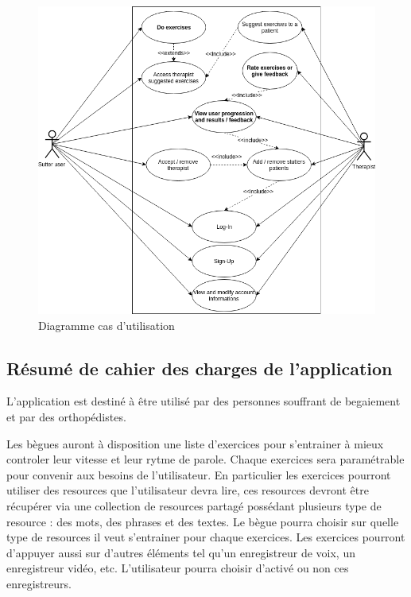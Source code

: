 \begin{figure}
  \includegraphics[width=.9\linewidth]{content/imgs/usecase.png}
  \caption{Diagramme cas d'utilisation}
  \label{fig:srs}
\end{figure}

\subsection{Résumé de cahier des charges de l'application}

L'application est destiné à être utilisé par des personnes souffrant de begaiement et par des orthopédistes.

Les bègues auront à disposition une liste d'exercices pour s'entrainer à mieux controler leur vitesse et leur rytme de parole. Chaque exercices sera paramétrable pour convenir aux besoins de l'utilisateur. En particulier les exercices pourront utiliser des resources que l'utilisateur devra lire, ces resources devront être récupérer via une collection de resources partagé possédant plusieurs type de resource : des mots, des phrases et des textes. Le bègue pourra choisir sur quelle type de resources il veut s'entrainer pour chaque exercices. Les exercices pourront d'appuyer aussi sur d'autres éléments tel qu'un enregistreur de voix, un enregistreur vidéo, etc. L'utilisateur pourra choisir d'activé ou non ces enregistreurs.

